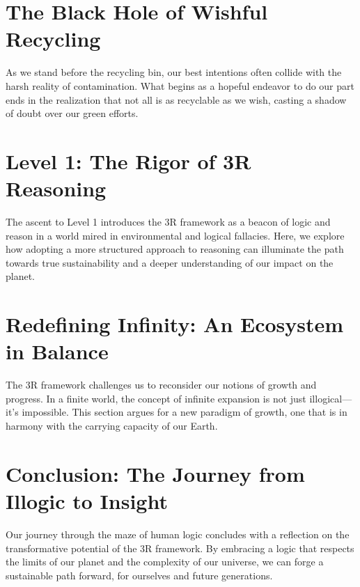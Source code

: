 \documentclass[12pt]{article}
\begin{document}
\section*{The Black Hole of Wishful Recycling}

As we stand before the recycling bin, our best intentions often collide with the harsh reality of contamination. What begins as a hopeful endeavor to do our part ends in the realization that not all is as recyclable as we wish, casting a shadow of doubt over our green efforts.

\section*{Level 1: The Rigor of 3R Reasoning}

The ascent to Level 1 introduces the 3R framework as a beacon of logic and reason in a world mired in environmental and logical fallacies. Here, we explore how adopting a more structured approach to reasoning can illuminate the path towards true sustainability and a deeper understanding of our impact on the planet.

\section*{Redefining Infinity: An Ecosystem in Balance}

The 3R framework challenges us to reconsider our notions of growth and progress. In a finite world, the concept of infinite expansion is not just illogical—it's impossible. This section argues for a new paradigm of growth, one that is in harmony with the carrying capacity of our Earth.

\section*{Conclusion: The Journey from Illogic to Insight}

Our journey through the maze of human logic concludes with a reflection on the transformative potential of the 3R framework. By embracing a logic that respects the limits of our planet and the complexity of our universe, we can forge a sustainable path forward, for ourselves and future generations.
\end{document}
